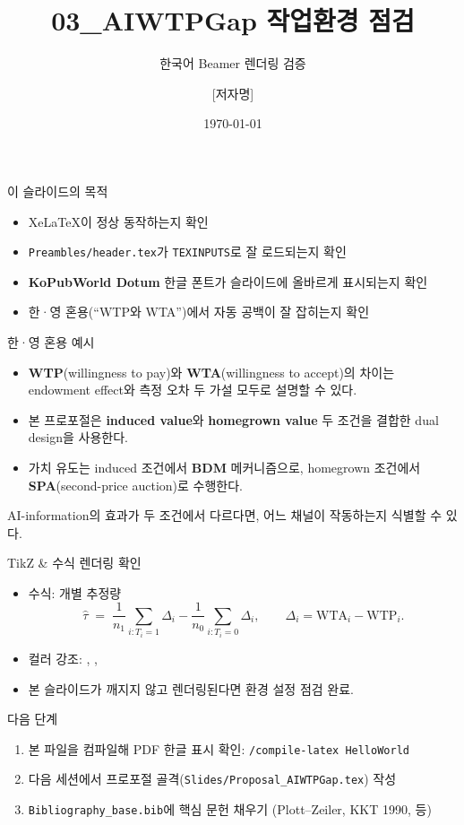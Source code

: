 \documentclass[aspectratio=169]{beamer}
\title{03\_AIWTPGap 작업환경 점검}
\subtitle{한국어 Beamer 렌더링 검증}
\author{[저자명]}
\institute{[소속]}
\date{\today}
\begin{document}
\frame{\titlepage}

\begin{frame}{이 슬라이드의 목적}
  \begin{itemize}
    \item XeLaTeX이 정상 동작하는지 확인
    \item \texttt{Preambles/header.tex}가 \texttt{TEXINPUTS}로 잘 로드되는지 확인
    \item \textbf{KoPubWorld Dotum} 한글 폰트가 슬라이드에 올바르게 표시되는지 확인
    \item 한·영 혼용(``WTP와 WTA'')에서 자동 공백이 잘 잡히는지 확인
  \end{itemize}
\end{frame}

\begin{frame}{한·영 혼용 예시}
  \begin{itemize}
    \item \textbf{WTP}(willingness to pay)와 \textbf{WTA}(willingness to accept)의 차이는 endowment effect와 측정 오차 두 가설 모두로 설명할 수 있다.
    \item 본 프로포절은 \textbf{induced value}와 \textbf{homegrown value} 두 조건을 결합한 dual design을 사용한다.
    \item 가치 유도는 induced 조건에서 \textbf{BDM} 메커니즘으로, homegrown 조건에서 \textbf{SPA}(second-price auction)로 수행한다.
  \end{itemize}

  \vspace{0.5em}
   AI-information의 효과가 두 조건에서 다르다면, 어느 채널이 작동하는지 식별할 수 있다.
\end{frame}

\begin{frame}{TikZ \& 수식 렌더링 확인}
  \begin{itemize}
    \item 수식: 개별 추정량
      \[
        \widehat{\tau} \;=\; \frac{1}{n_1}\sum_{i:T_i=1} \Delta_i
                            - \frac{1}{n_0}\sum_{i:T_i=0} \Delta_i,
        \qquad \Delta_i = \mathrm{WTA}_i - \mathrm{WTP}_i.
      \]
    \item 컬러 강조: , , 
    \item 본 슬라이드가 깨지지 않고 렌더링된다면 환경 설정 점검 완료.
  \end{itemize}
\end{frame}

\begin{frame}{다음 단계}
  \begin{enumerate}
    \item 본 파일을 컴파일해 PDF 한글 표시 확인: \texttt{/compile-latex HelloWorld}
    \item 다음 세션에서 프로포절 골격(\texttt{Slides/Proposal\_AIWTPGap.tex}) 작성
    \item \texttt{Bibliography\_base.bib}에 핵심 문헌 채우기 (Plott--Zeiler, KKT 1990, 등)
  \end{enumerate}
\end{frame}
\end{document}
